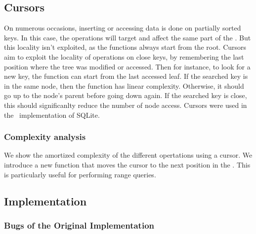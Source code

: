 \subsection{Cursors}
On numerous occasions, inserting or accessing data is done on partially sorted keys.
In this case, the operations will target and affect the same part of the \btree.
But this locality isn't exploited, as the functions always start from the root.
Cursors aim to exploit the locality of operations on close keys, by remembering the last position where the tree was modified or accessed.
Then for instance, to look for a new key, the function can start from the last accessed leaf. If the searched key is in the same node, then the function has linear complexity.
Otherwise, it should go up to the node's parent before going down again. If the searched key is close, this should significanlty reduce the number of node access.
Cursors were used in the \btrees\ implementation of SQLite.

\subsubsection{Complexity analysis}
We show the amortized complexity of the different opertations using a cursor. We introduce a new function that moves the cursor to the next position in the \btree.
This is particularly useful for performing range queries.

\subsection{Implementation}
\subsubsection{Bugs of the Original Implementation}
